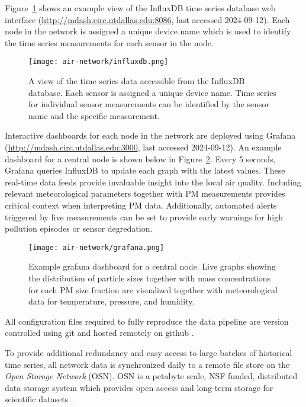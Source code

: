 Figure~\ref{fig:influxdb} shows an example view of the InfluxDB time series
database web interface (\url{http://mdash.circ.utdallas.edu:8086}, last accessed
2024-09-12). Each node in the network is assigned a unique device name which is
used to identify the time series measurements for each sensor in the node.

\begin{figure}[!h]
  \centering
  \texttt{[image: air-network/influxdb.png]}
  \caption{A view of the time series data accessible from the InfluxDB database.
  Each sensor is assigned a unique device name. Time series for individual
  sensor measurements can be identified by the sensor name and the specific
  measurement.}
  \label{fig:influxdb}
\end{figure}

Interactive dashboards for each node in the network are deployed using Grafana
(\url{http://mdash.circ.utdallas.edu:3000}, last accessed 2024-09-12). An example
dashboard for a central node is shown below in Figure~\ref{fig:grafana}. Every 5
seconds, Grafana queries InfluxDB to update each graph with the latest values.
These real-time data feeds provide invaluable insight into the local air
quality. Including relevant meteorological parameters together with PM
measurements provides critical context when interpreting PM data. Additionally,
automated alerts triggered by live measurements can be set to provide early warnings
for high pollution episodes or sensor degredation.

\begin{figure}[!h]
  \centering
  \texttt{[image: air-network/grafana.png]}
  \caption{Example grafana dashboard for a central node. Live graphs showing the
  distribution of particle sizes together with mass concentrations for each PM
  size fraction are visualized together with meteorological data for
  temperature, pressure, and humidity.}
  \label{fig:grafana}
\end{figure}
All configuration files required to fully reproduce the data pipeline are
version controlled using git and hosted remotely on github \cite{mints-docker}.

To provide additional redundancy and easy access to large batches of historical
time series, all network data is synchronized daily to a remote file store on
the \textit{Open Storage Network} (OSN). OSN is a petabyte scale, NSF funded,
distributed data storage system which provides open access and long-term storage
for scientific datasets \cite{osn}.


